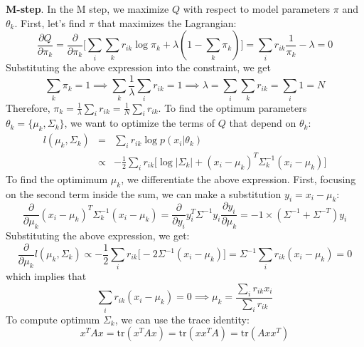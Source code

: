 \textbf{M-step}. In the M step, we maximize $Q$ with respect to model parameters $\pi$ and $\theta_k$. First, let's find $\pi$ that maximizes the Lagrangian:
\begin{equation}
    \frac{\partial Q}{\partial \pi_k} = \frac{\partial}{\partial \pi_k} \bigg[\sum_i \sum_k r_{ik} \log \pi_k + \lambda(1 - \sum_k \pi_k)\bigg] = \sum_i r_{ik} \frac{1}{\pi_k} - \lambda = 0
\end{equation}
Substituting the above expression into the constraint, we get
\begin{equation}
    \sum_k \pi_k = 1 \implies  \sum_k \frac{1}{\lambda}\sum_i r_{ik} = 1 \implies \lambda = 
    \sum_i \sum_k r_{ik} = \sum_i 1 = N 
\end{equation}
Therefore, $\pi_k = \frac{1}{\lambda}\sum_i r_{ik} = \frac{1}{N}\sum_i r_{ik}$. To find the optimum parameters $\theta_k = \{\mu_k, \Sigma_k\}$, we want to optimize the terms of $Q$ that depend on $\theta_k$:
\begin{eqnarray}
    l(\mu_k,\Sigma_k) &=& \sum_i r_{ik} \log p(x_i|\theta_k) \nonumber \\
    &\propto& -\frac{1}{2} \sum_i r_{ik} \bigg[\log|\Sigma_k| + (x_i - \mu_k)^{T}\Sigma_{k}^{-1}(x_i - \mu_k) \bigg] 
\end{eqnarray}
To find the optimimum $\mu_k$, we differentiate the above expression. First, focusing on the second term inside the sum, we can make a substitution $y_i = x_i - \mu_k$: 
\begin{equation}
    \frac{\partial}{\partial \mu_k} (x_i - \mu_k)^{T}\Sigma_{k}^{-1}(x_i - \mu_k) = \frac{\partial}{\partial y_i} y_i^{T} \Sigma^{-1} y_i \frac{\partial y_i}{\partial \mu_k} = -1 \times (\Sigma^{-1} + \Sigma^{-T})y_i 
\end{equation}
Substituting the above expression, we get:
\begin{equation}
    \frac{\partial}{\partial \mu_k} l(\mu_k, \Sigma_k) \propto -\frac{1}{2}\sum_i r_{ik}\bigg[-2\Sigma^{-1}(x_i - \mu_k)\bigg] = \Sigma^{-1} \sum_i r_{ik} (x_i - \mu_k) = 0
\end{equation}
which implies that
\begin{equation}
    \sum_i r_{ik}(x_i - \mu_k) = 0 \implies \mu_k = \frac{\sum_i r_{ik} x_i}{\sum_i r_{ik}} 
\end{equation}
To compute optimum $\Sigma_k$, we can use the trace identity:
\begin{equation}
    x^{T}Ax = \mathrm{tr}(x^{T}Ax) = \mathrm{tr}(xx^{T}A) = \mathrm{tr}(Axx^{T})
\end{equation}
